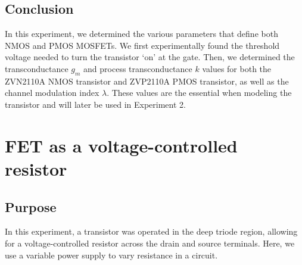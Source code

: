 \documentclass{report}
\begin{document}
\subsection{Conclusion}
In this experiment, we determined the various parameters that define both NMOS and PMOS MOSFETs. We first experimentally found the threshold voltage needed to turn the transistor `on' at the gate. Then, we determined the transconductance $g_m$ and process transconductance $k$ values for both the ZVN2110A NMOS transistor and ZVP2110A PMOS transistor, as well as the channel modulation index $\lambda$. These values are the essential when modeling the transistor and will later be used in Experiment 2.

\section{FET as a voltage-controlled resistor}

\subsection{Purpose}
In this experiment, a transistor was operated in the deep triode region, allowing for a voltage-controlled resistor across the drain and source terminals. Here, we use a variable power supply to vary resistance in a circuit.
\end{document}
